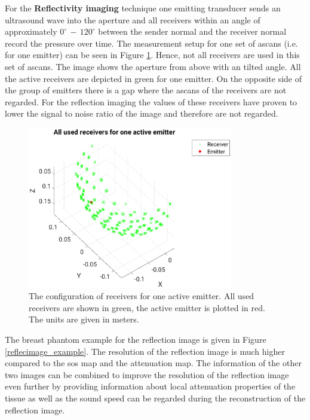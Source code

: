 For the \textbf{Reflectivity imaging} technique one emitting transducer sends an ultrasound wave into the aperture and all receivers within an angle of approximately $0^{\circ} \, - \, 120^{\circ}$ between the sender normal and the receiver normal record the pressure over time. The measurement setup for one set of \acp{ascan} (i.e. for one emitter) can be seen in Figure \ref{measurement_volume}. Hence, not all receivers are used in this set of \acp{ascan}. The image shows the aperture from above with an tilted angle. All the active receivers are depicted in green for one emitter. On the opposite side of the group of emitters there is a gap where the \acp{ascan} of the receivers are not regarded. For the reflection imaging the values of these receivers have proven to lower the signal to noise ratio of the image and therefore are not regarded.


\begin{figure}[H]
    \centering
    \includegraphics[width=0.8\textwidth]{Graphics/measurement_volume.eps}
    \caption{ The configuration of receivers for one active emitter. All used receivers are shown in green, the active emitter is plotted in red. The units are given in meters.}
    \label{measurement_volume}
\end{figure}

The breast phantom example for the reflection image is given in Figure \ref{reflecimage_example}. The resolution of the reflection image is much higher compared to the \ac{sos} map and the attenuation map. The information of the other two images can be combined to improve the resolution of the reflection image even further by providing information about local attenuation properties of the tissue as well as the sound speed can be regarded during the reconstruction of the reflection image.

